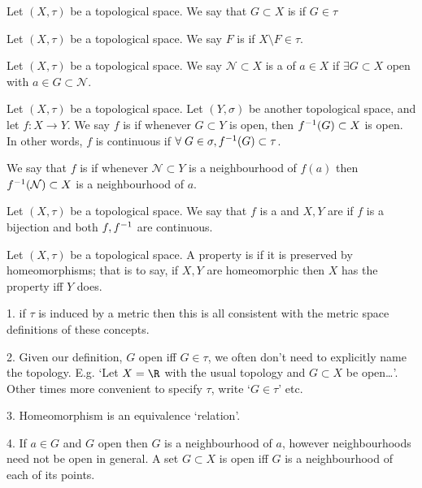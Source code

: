 \begin{definition}[Open]
    Let $(X,\tau)$ be a topological space. We say that $G\subset X$ is  if $G\in \tau$
\end{definition}

\begin{definition}[Closed]
    Let $(X,\tau)$ be a topological space.
    We say $F$ is  if $X  \setminus F \in\tau$.
\end{definition}

\begin{definition}[Neighbourhood]
    Let $(X,\tau)$ be a topological space. 
    We say $\mathcal{N} \subset X$ is a  of $a\in X$ if $\exists G\subset X$ open with $a\in G\subset \mathcal{N}$.
\end{definition}

\begin{definition}[Continuity]
    Let $(X,\tau)$ be a topological space.
    Let $(Y,\sigma)$ be another topological space, and let $f:X \to Y$. We say $f$ is  if whenever $G\subset Y$ is open, then $f^{-1}(G)\subset X$ is open.
    In other words, $f$ is continuous if $\forall \; G \in \sigma, f^{-1}(G) \subset \tau$.
    
    We say that $f$ is  if whenever $\mathcal{N} \subset Y$ is a neighbourhood of $f(a)$ then $f^{-1}(\mathcal{N})\subset X$ is a neighbourhood of $a$.
\end{definition}

\begin{definition}[Homeomorphisms]
    Let $(X,\tau)$ be a topological space.
    We say that $f$ is a  and $X,Y$ are  if $f$ is a bijection and both $f,f^{-1}$ are continuous. 
\end{definition} 

\begin{definition}[Topological]
    Let $(X,\tau)$ be a topological space.
    A property is  if it is preserved by homeomorphisms; that is to say, if $X,Y$ are homeomorphic then $X$ has the property iff $Y$ does.
\end{definition} 

\begin{remark}
1. if $\tau$ is induced by a metric then this is all consistent with the metric space definitions of these concepts.

2. Given our definition, $G$ open iff $G\in \tau$, we often don't need to explicitly name the topology.
E.g. `Let $X=\R$ with the usual topology and $G\subset X$ be open\dots'.
Other times more convenient to specify $\tau$, write `$G\in \tau$' etc.

3. Homeomorphism is an equivalence `relation'.

4. If $a\in G$ and $G$ open then $G$ is a neighbourhood of $a$, however neighbourhoods need not be open in general. A set $G\subset X$ is open iff $G$ is a neighbourhood of each of its points.
\end{remark}

